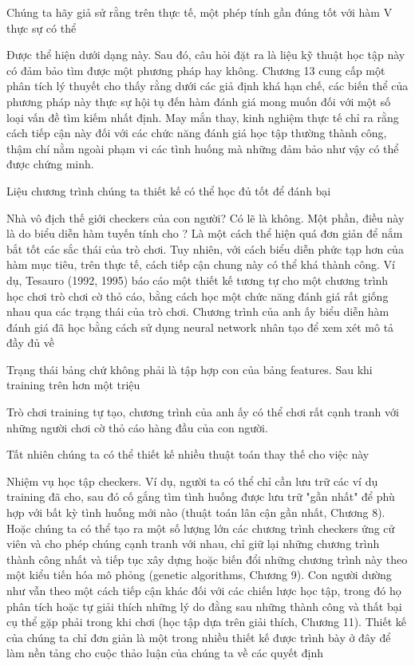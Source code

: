 Chúng ta hãy giả sử rằng trên thực tế, một phép tính gần đúng tốt với hàm V thực sự có thể

Được thể hiện dưới dạng này. Sau đó, câu hỏi đặt ra là liệu kỹ thuật học tập này có đảm bảo tìm được một phương pháp hay không. Chương 13 cung cấp một phân tích lý thuyết cho thấy rằng dưới các giả định khá hạn chế, các biến thể của phương pháp này thực sự hội tụ đến hàm đánh giá mong muốn đối với một số loại vấn đề tìm kiếm nhất định. May mắn thay, kinh nghiệm thực tế chỉ ra rằng cách tiếp cận này đối với các chức năng đánh giá học tập thường thành công, thậm chí nằm ngoài phạm vi các tình huống mà những đảm bảo như vậy có thể được chứng minh.

Liệu chương trình chúng ta thiết kế có thể học đủ tốt để đánh bại

Nhà vô địch thế giới checkers của con người? Có lẽ là không. Một phần, điều này là do biểu diễn hàm tuyến tính cho ? Là một cách thể hiện quá đơn giản để nắm bắt tốt các sắc thái của trò chơi. Tuy nhiên, với cách biểu diễn phức tạp hơn của hàm mục tiêu, trên thực tế, cách tiếp cận chung này có thể khá thành công. Ví dụ, Tesauro (1992, 1995) báo cáo một thiết kế tương tự cho một chương trình học chơi trò chơi cờ thỏ cáo, bằng cách học một chức năng đánh giá rất giống nhau qua các trạng thái của trò chơi. Chương trình của anh ấy biểu diễn hàm đánh giá đã học bằng cách sử dụng neural network nhân tạo để xem xét mô tả đầy đủ về

Trạng thái bảng chứ không phải là tập hợp con của bảng features. Sau khi training trên hơn một triệu

Trò chơi training tự tạo, chương trình của anh ấy có thể chơi rất cạnh tranh với những người chơi cờ thỏ cáo hàng đầu của con người.

Tất nhiên chúng ta có thể thiết kế nhiều thuật toán thay thế cho việc này

Nhiệm vụ học tập checkers. Ví dụ, người ta có thể chỉ cần lưu trữ các ví dụ training đã cho, sau đó cố gắng tìm tình huống được lưu trữ "gần nhất" để phù hợp với bất kỳ tình huống mới nào (thuật toán lân cận gần nhất, Chương 8). Hoặc chúng ta có thể tạo ra một số lượng lớn các chương trình checkers ứng cử viên và cho phép chúng cạnh tranh với nhau, chỉ giữ lại những chương trình thành công nhất và tiếp tục xây dựng hoặc biến đổi những chương trình này theo một kiểu tiến hóa mô phỏng (genetic algorithms, Chương 9). Con người dường như vẫn theo một cách tiếp cận khác đối với các chiến lược học tập, trong đó họ phân tích hoặc tự giải thích những lý do đằng sau những thành công và thất bại cụ thể gặp phải trong khi chơi (học tập dựa trên giải thích, Chương 11). Thiết kế của chúng ta chỉ đơn giản là một trong nhiều thiết kế được trình bày ở đây để làm nền tảng cho cuộc thảo luận của chúng ta về các quyết định

